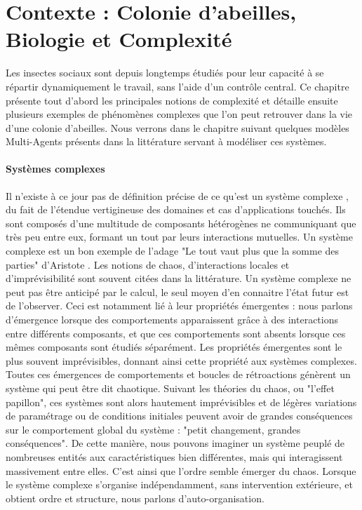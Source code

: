 \chapter*{Contexte : Colonie d'abeilles, Biologie et Complexité}
	
	Les insectes sociaux sont depuis longtemps étudiés pour leur capacité à se répartir dynamiquement le travail, sans l'aide d'un contrôle central. Ce chapitre présente tout d'abord les principales notions de complexité et détaille ensuite plusieurs exemples de phénomènes complexes que l'on peut retrouver dans la vie d'une colonie d'abeilles. Nous verrons dans le chapitre suivant quelques modèles Multi-Agents présents dans la littérature servant à modéliser ces systèmes.

	
		\subsubsection{Systèmes complexes}
		
			Il n'existe à ce jour pas de définition précise de ce qu'est un système complexe \cite{heylighen_complexity_2008}, du fait de l'étendue vertigineuse des domaines et cas d'applications touchés. Ils sont composés d'une multitude de composants hétérogènes ne communiquant que très peu entre eux, formant un tout par leurs interactions mutuelles. Un système complexe est un bon exemple de l'adage "Le tout vaut plus que la somme des parties" d'Aristote \cite{edmonds_what_1999}. Les notions de chaos, d'interactions locales et d'imprévisibilité sont souvent citées dans la littérature. Un système complexe ne peut pas être anticipé par le calcul, le seul moyen d'en connaitre l'état futur est de l'observer. 
			Ceci est notamment lié à leur propriétés émergentes : nous parlons d'émergence lorsque des comportements apparaissent grâce à des interactions entre différents composants, et que ces comportements sont absents lorsque ces mêmes composants sont étudiés séparément. Les propriétés émergentes sont le plus souvent imprévisibles, donnant ainsi cette propriété aux systèmes complexes. Toutes ces émergences de comportements et boucles de rétroactions génèrent un système qui peut être dit chaotique. 
			Suivant les théories du chaos, ou "l'effet papillon", ces systèmes sont alors hautement imprévisibles et de légères variations de paramétrage ou de conditions initiales peuvent avoir de grandes conséquences sur le comportement global du système : "petit changement, grandes conséquences". De cette manière, nous pouvons imaginer un système peuplé de nombreuses entités aux caractéristiques bien différentes, mais qui interagissent massivement entre elles. C'est ainsi que l'ordre semble émerger du chaos. Lorsque le système complexe s'organise indépendamment, sans intervention extérieure, et obtient ordre et structure, nous parlons d'auto-organisation.
			
